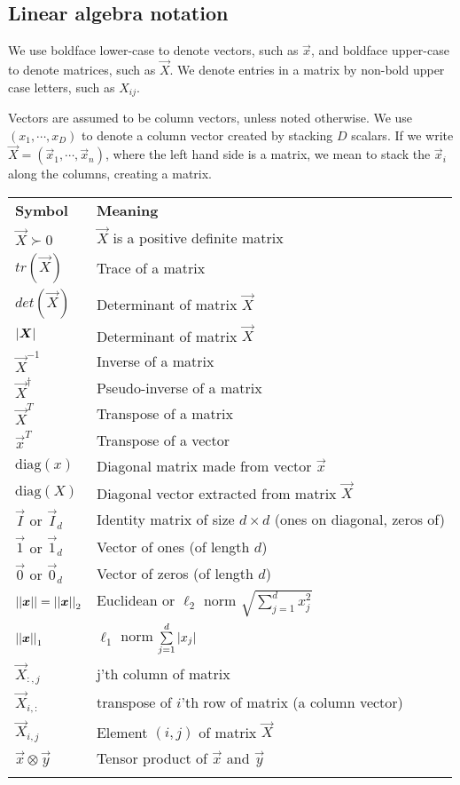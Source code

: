 {\begin{english}
\section*{Linear algebra notation}
We use boldface lower-case to denote vectors, such as $\vec{x}$, and boldface upper-case to denote matrices, such as $\vec{X}$. We denote entries in a matrix by non-bold upper case letters, such as $X_{ij}$.

Vectors are assumed to be column vectors, unless noted otherwise. We use $(x_1,\cdots,x_D)$ to denote a column vector created by stacking $D$ scalars. If we write $\vec{X}=(\vec{x}_1,\cdots,\vec{x}_n)$, where the left hand side is a matrix, we mean to stack the $\vec{x}_i$ along the columns, creating a matrix.

\begin{longtable}{ll}
\hline\noalign{\smallskip}
\textbf{Symbol} & \textbf{Meaning} \\
\noalign{\smallskip}\hline\noalign{\smallskip}
$\vec{X} \succ 0$ & $\vec{X}$ is a positive definite matrix\\
$tr(\vec{X})$ & Trace of a matrix\\
$det(\vec{X})$ & Determinant of matrix $\vec{X}$\\
$\abs{\vec{X}}$ & Determinant of matrix $\vec{X}$\\
$\vec{X}^{-1}$ & Inverse of a matrix\\
$\vec{X}^{\dagger}$ & Pseudo-inverse of a matrix\\
$\vec{X}^T$ & Transpose of a matrix\\
$\vec{x}^T$ & Transpose of a vector\\
$\mathrm{diag}(x)$ & Diagonal matrix made from vector $\vec{x}$\\
$\mathrm{diag}(X)$ & Diagonal vector extracted from matrix $\vec{X}$\\
$\vec{I}$ or $\vec{I}_d$ & Identity matrix of size $d \times d$ (ones on diagonal, zeros of)\\
$\vec{1}$ or $\vec{1}_d$ & Vector of ones (of length $d$)\\
$\vec{0}$ or $\vec{0}_d$ & Vector of zeros (of length $d$)\\
$\abs{\abs{\vec{x}}}=\abs{\abs{\vec{x}}}_2$ & Euclidean or $\ell_2$ norm $\sqrt{\sum\limits_{j=1}^{d} x_j^2}$\\
$\abs{\abs{\vec{x}}}_1$ & $\ell_1$ norm $\sum\limits_{j=1}^{d} \left\lvert x_j\right\rvert$\\
$\vec{X}_{:,j}$ & j'th column of matrix\\
$\vec{X}_{i,:}$ & transpose of $i$'th row of matrix (a column vector)\\
$\vec{X}_{i,j}$ & Element $(i,j)$ of matrix $\vec{X}$ \\
$\vec{x} \otimes \vec{y}$ & Tensor product of $\vec{x}$ and $\vec{y}$\\
\noalign{\smallskip}\hline\noalign{\smallskip}
\end{longtable}



\end{english}}
